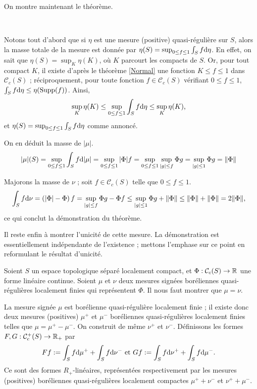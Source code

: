 \documentclass{article}
\begin{document}
On montre maintenant le théorème.

\begin{Dem}~

Notons tout d'abord que si $\eta$ est une mesure (positive) quasi-régulière sur $S$, alors la masse totale de la mesure est donnée par $\eta(S)=\sup_{0\leq f\leq1}\int_Sf\mathrm{d}\eta$. En effet, on sait que $\eta(S)=\sup_{K}\eta(K)$, où $K$ parcourt les compacts de $S$. Or, pour tout compact $K$, il existe d'après le théorème \ref{Normal} une fonction $K\leq f\leq1$ dans $\mathcal C_c(S)$ ; réciproquement, pour toute fonction $f\in\mathcal C_c(S)$ vérifiant $0\leq f\leq1$, $\int_Sf\mathrm{d}\eta\leq\eta(\mathrm{Supp}(f))$. Ainsi,
$$\sup_K\eta(K)\leq\sup_{0\leq f\leq1}\int_Sf\mathrm{d}\eta\leq\sup_K\eta(K)\text,$$
et $\eta(S)=\sup_{0\leq f\leq1}\int_Sf\mathrm{d}\eta$ comme annoncé.
\bigskip

On en déduit la masse de $|\mu|$.
$$|\mu|(S) = \sup_{0\leq f\leq1}\int_Sf\mathrm{d}|\mu|
           = \sup_{0\leq f\leq1}|\Phi|f
           = \sup_{0\leq f\leq1}\sup_{|g|\leq f}\Phi g
           = \sup_{|g|\leq 1}\Phi g
           = \|\Phi\|$$

Majorons la masse de $\nu$ ; soit $f\in\mathcal C_c(S)$ telle que $0\leq f\leq1$.
$$\int_Sf\mathrm{d}\nu    = \left(|\Phi|-\Phi\right)f
                    = \sup_{|g|\leq f}\Phi g-\Phi f
                 \leq \sup_{|g|\leq1}\Phi g+\|\Phi\|
                 \leq \|\Phi\|+\|\Phi\|
                    = 2\|\Phi\|\text,$$
ce qui conclut la démonstration du théorème.
\end{Dem}

Il reste enfin à montrer l'unicité de cette mesure. La démonstration est essentiellement indépendante de l'existence ; mettons l'emphase sur ce point en reformulant le résultat d'unicité.

Soient $S$ un espace topologique séparé localement compact, et $\Phi:\mathcal C_c(S)\to\mathbb{R}$ une forme linéaire continue. Soient $\mu$ et $\nu$ deux mesures signées boréliennes quasi-régulières localement finies qui représentent $\Phi$. Il nous faut montrer que $\mu=\nu$.

La mesure signée $\mu$ est borélienne quasi-régulière localement finie ; il existe donc deux mesures (positives) $\mu^+$ et $\mu^-$ boréliennes quasi-régulières localement finies telles que $\mu=\mu^+-\mu^-$. On construit de même $\nu^+$ et $\nu^-$. Définissons les formes $F,G:\mathcal C_c^+(S)\to\mathbb{R}_+$ par
$$Ff:=\int_Sf\mathrm{d}\mu^++\int_Sf\mathrm{d}\nu^-\text{ et }Gf:=\int_Sf\mathrm{d}\nu^++\int_Sf\mathrm{d}\mu^-\text.$$
Ce sont des formes $R_+$-linéaires, représentées respectivement par les mesures (positives) boréliennes quasi-régulières localement compactes $\mu^++\nu^-$ et $\nu^++\mu^-$.
\end{document}
